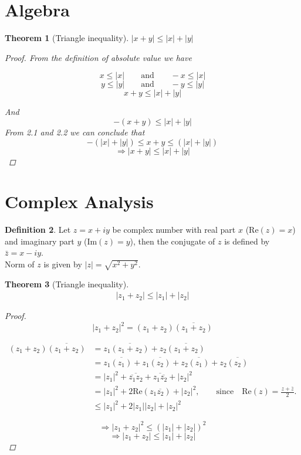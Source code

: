 \documentclass[paper=a4, fontsize=12pt]{scrartcl} %
\newtheorem{thm}{Theorem}[section]
\theoremstyle{definition}
\newtheorem{defn}[thm]{Definition}
\numberwithin{equation}{section} %
\numberwithin{figure}{section} %
\numberwithin{table}{section} %
\begin{document}
\section{Algebra}
\begin{thm}[Triangle inequality] $|x+y|\leq |x|+|y|$

\begin{proof}
From the definition of absolute value we have

$$x\leq |x|\qquad \text{and}\qquad -x\leq |x|$$
$$y\leq |y|\qquad \text{and}\qquad -y\leq |y|$$
\begin{equation}
x+y\leq |x|+|y|
\end{equation}

And
\begin{equation}
 -(x+y)\leq |x|+|y|
\end{equation}
From 2.1 and 2.2 we can conclude that
$$-(|x|+|y| )\leq x+y\leq (|x|+|y|)$$
$$\Rightarrow|x+y|\leq |x|+|y|$$

\end{proof}
\end{thm}
\section{Complex Analysis}
\begin{defn}
 Let $z=x+iy$ be complex number with real part $x$ ($\text{Re}(z)=x$) and imaginary part $y$ ($\text{Im}(z)=y$), then the conjugate of $z$ is defined by $\bar{z}=x-iy$.\\ Norm of $z$ is given by $|z|=\sqrt{x^2+y^2} $.
\end{defn}
\begin{thm}[Triangle inequality]
\begin{align}
|z_1+z_2 |\leq |z_1 |+|z_2 |
\end{align}
\begin{proof}
$$|z_1+z_2 |^2=(z_1+z_2)\overline{(z_1+z_2)}$$

\begin{align*}
  (z_1+z_2)\overline{(z_1+z_2)}  &=z_1 \overline{(z_1+z_2)}+z_2 \overline{(z_1+z_2)}\\
                                 &=z_1 \overline{(z_1)}+z_1 \overline{(z_2)}+z_2 \overline{(z_1)}+z_2 \overline{(z_2)}\\
                                 &=|z_1|^2+\overline{\overline{z_1}z_2}+\overline{z_1\overline{z_2}}+|z_2 |^2 \\
                                 &= |z_1|^2+2\text{Re}(z_1\overline{z_2})+|z_2|^2, \qquad \text{since}\quad \text{Re}(z) =\frac{z+\overline{z}}{2}.\\
                                 &\leq |z_1|^2+2|z_1||z_2|+|z_2|^2
\end{align*}

$$\Rightarrow |z_1+z_2|^2\leq (|z_1|+|z_2|)^2$$
$$\Rightarrow  |z_1+z_2|\leq |z_1 |+|z_2|  $$

\end{proof}
\end{thm}
\end{document}

